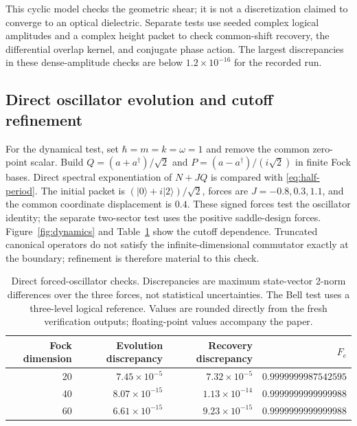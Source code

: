 \documentclass[aip,adv,reprint,onecolumn,amsmath,amssymb]{revtex4-2}
\newcommand{\ket}[1]{\lvert #1\rangle}
\begin{document}
This cyclic model checks the geometric shear; it is not a discretization claimed to converge to an optical dielectric. Separate tests use seeded complex logical amplitudes and a complex height packet to check common-shift recovery, the differential overlap kernel, and conjugate phase action. The largest discrepancies in these dense-amplitude checks are below $1.2\times10^{-16}$ for the recorded run.

\subsection{Direct oscillator evolution and cutoff refinement}
For the dynamical test, set $\hbar=m=k=\omega=1$ and remove the common zero-point scalar. Build $Q=(a+a^\dagger)/\sqrt2$ and $P=(a-a^\dagger)/(i\sqrt2)$ in finite Fock bases. Direct spectral exponentiation of $N+JQ$ is compared with \eqref{eq:half-period}. The initial packet is $(\ket0+i\ket2)/\sqrt2$, forces are $J=-0.8,0.3,1.1$, and the common coordinate displacement is $0.4$. These signed forces test the oscillator identity; the separate two-sector test uses the positive saddle-design forces. Figure~\ref{fig:dynamics} and Table~\ref{tab:cutoff} show the cutoff dependence. Truncated canonical operators do not satisfy the infinite-dimensional commutator exactly at the boundary; refinement is therefore material to this check.

\begin{table}[ht]
\centering\small
\begin{tabular}{rrrr}\toprule
Fock dimension & Evolution discrepancy & Recovery discrepancy & $F_e$\\\midrule
20 & $7.45\times10^{-5}$ & $7.32\times10^{-5}$ & $0.9999999987542595$\\
40 & $8.07\times10^{-15}$ & $1.13\times10^{-14}$ & $0.9999999999999988$\\
60 & $6.61\times10^{-15}$ & $9.23\times10^{-15}$ & $0.9999999999999988$\\\bottomrule
\end{tabular}
\caption{Direct forced-oscillator checks. Discrepancies are maximum state-vector 2-norm differences over the three forces, not statistical uncertainties. The Bell test uses a three-level logical reference. Values are rounded directly from the fresh verification outputs; floating-point values accompany the paper.}
\label{tab:cutoff}
\end{table}
\end{document}
